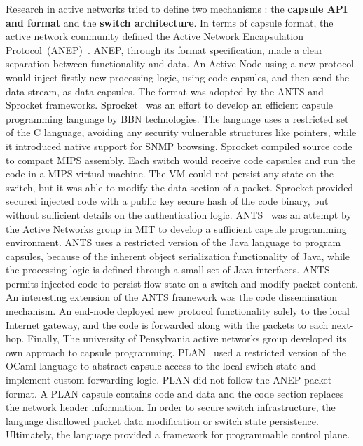 Research in active networks tried to define two mechanisms : the {\bf capsule
  API and format} and the {\bf switch architecture}. In terms of capsule
format, the active network community defined the Active Network Encapsulation
Protocol~(ANEP)~\cite{alexander1997a}.  ANEP, through its format specification,
made a clear separation between functionality and data. An Active Node using a
new protocol would inject firstly new processing logic, using code capsules, and
then send the data stream, as data capsules.  The format was adopted by the ANTS
and Sprocket frameworks.  Sprocket~\cite{Schwartz2000} was an effort to develop
an efficient capsule programming language by BBN technologies. The language uses
a restricted set of the C language, avoiding any security vulnerable structures
like pointers, while it introduced native support for SNMP browsing. Sprocket
compiled source code to compact MIPS assembly. Each switch would receive code
capsules and run the code in a MIPS virtual machine. The VM could not persist
any state on the switch, but it was able to modify the data section of a packet.
Sprocket provided secured injected code with a public key secure hash of the
code binary, but without sufficient details on the authentication logic.
ANTS~\cite{Wetherall1998} was an attempt by the Active Networks group in MIT to
develop a sufficient capsule programming environment.  ANTS uses a restricted
version of the Java language to program capsules, because of the inherent object
serialization functionality of Java, while the processing logic is defined
through a small set of Java interfaces. ANTS permits injected code to persist
flow state on a switch and modify packet content. An interesting extension of
the ANTS framework was the code dissemination mechanism. An end-node deployed
new protocol functionality solely to the local Internet gateway, and the code is
forwarded along with the packets to each next-hop. Finally, The university of
Pensylvania active networks group developed its own approach to capsule
programming.  PLAN~\cite{Hicks1998} used a restricted version of the OCaml
language to abstract capsule access to the local switch state and implement
custom forwarding logic. PLAN did not follow the ANEP packet format. A PLAN
capsule contains code and data and the code section replaces the network header
information. In order to secure switch infrastructure, the language disallowed
packet data modification or switch state persistence.  Ultimately, the language
provided a framework for programmable control plane.

